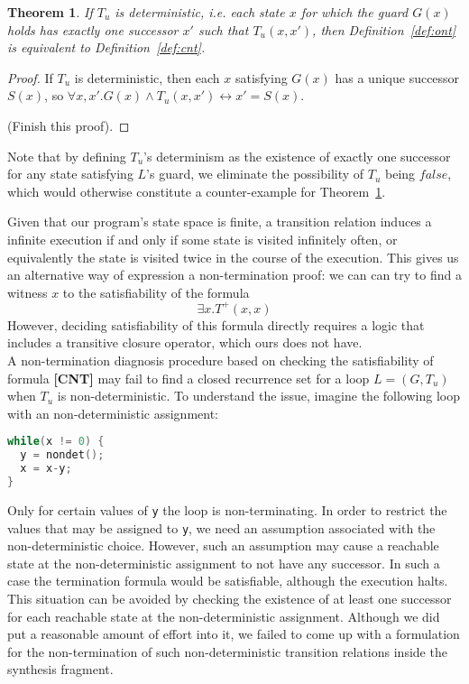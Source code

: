 \documentclass[preprint]{sigplanconf}
\newtheorem{theorem}{Theorem}
\theoremstyle{definition}
\begin{document}
\begin{theorem}
\label{thm:cnt}
 If $T_u$ is deterministic, i.e. each state $x$ for which the guard $G(x)$ holds has exactly one successor $x'$ such that $T_u(x, x')$, then
 Definition~\ref{def:ont} is equivalent to Definition~\ref{def:cnt}.
\end{theorem}

\begin{proof}
 If $T_u$ is deterministic, then each $x$ satisfying $G(x)$ has a unique successor $S(x)$, so $\forall x, x' . G(x) \wedge T_u(x, x') \leftrightarrow x' = S(x)$.
 
 (Finish this proof).
\end{proof}

Note that by defining $T_u$'s determinism as the existence of exactly one successor for any state satisfying $L$'s guard, 
we eliminate the possibility of $T_u$ being $false$, which would otherwise constitute a counter-example for Theorem~\ref{thm:cnt}.

Given that our program's state space is finite, a transition relation induces a infinite execution if and only if some state is 
visited infinitely often, or equivalently the state is visited twice in the course of the execution.
This gives us an alternative way of expression a non-termination proof: we can can try to find a witness $x$ to the satisfiability
of the formula
$$ \exists x . T^+(x, x)$$
However, deciding satisfiability of this formula directly requires a logic that includes a transitive closure operator, which
ours does not have.\\

 A non-termination diagnosis procedure based on checking the satisfiability of formula {\bf [CNT]}
may fail to find a closed recurrence set for a loop $L=(G, T_u)$ when $T_u$ is non-deterministic.  
To understand the issue, imagine the following loop with an non-deterministic assignment:

\begin{lstlisting}[language=C]
while(x != 0) {
  y = nondet();
  x = x-y;
}
\end{lstlisting}

Only for certain values of \texttt{y} the loop is non-terminating.  In order
to restrict the values that may be assigned to \texttt{y}, we need an
assumption associated with the non-deterministic choice.  However, such an
assumption may cause a reachable state at the non-deterministic assignment
to not have any successor.  In such a case the termination formula would be
satisfiable, although the execution halts.  This situation can be avoided by
checking the existence of at least one successor for each reachable state at
the non-deterministic assignment.  Although we did put a reasonable amount
of effort into it, we failed to come up with a formulation for the
non-termination of such non-deterministic transition relations inside the
synthesis fragment.
%
\end{document}
